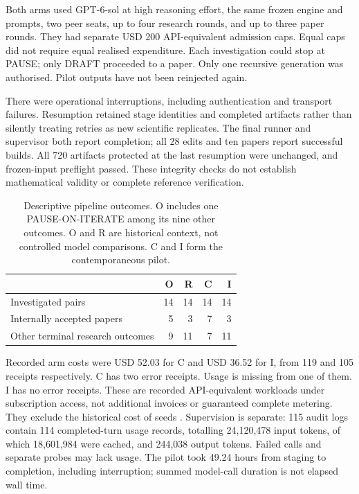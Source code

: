 \documentclass[11pt,a4paper]{article}
\begin{document}
Both arms used GPT-6-sol at high reasoning effort, the same frozen engine
and prompts, two peer seats, up to four research rounds, and up to three
paper rounds. They had separate USD 200 API-equivalent admission caps.
Equal caps did not require equal realised expenditure. Each investigation
could stop at PAUSE; only DRAFT proceeded to a paper. Only one recursive
generation was authorised. Pilot outputs have not been reinjected again.

There were operational interruptions, including authentication and transport
failures. Resumption retained stage identities and completed artifacts rather
than silently treating retries as new scientific replicates. The final
runner and supervisor both report completion; all 28 edits and ten papers
report successful builds. All 720 artifacts protected at the last resumption
were unchanged, and frozen-input preflight passed. These integrity checks do
not establish mathematical validity or complete reference verification.

\begin{table}[ht]
\centering\small
\begin{tabular}{lrrrr}
\toprule
 & O & R & C & I\\
\midrule
Investigated pairs &14&14&14&14\\
Internally accepted papers &5&3&7&3\\
Other terminal research outcomes &9&11&7&11\\
\bottomrule
\end{tabular}
\caption{Descriptive pipeline outcomes. O includes one PAUSE-ON-ITERATE
among its nine other outcomes. O and R are historical context, not controlled
model comparisons. C and I form the contemporaneous pilot.}
\end{table}

Recorded arm costs were USD 52.03 for C and USD 36.52 for I, from 119 and
105 receipts respectively. C has two error receipts. Usage is missing from
one of them. I has no error receipts. These are recorded API-equivalent workloads under subscription
access, not additional invoices or guaranteed complete metering. They exclude
the historical cost of seeds \cite{readout}. Supervision is separate: 115 audit logs contain
114 completed-turn usage records, totalling 24,120,478 input tokens, of which
18,601,984 were cached, and 244,038 output tokens. Failed calls and separate
probes may lack usage. The pilot took 49.24 hours from staging to completion,
including interruption; summed model-call duration is not elapsed wall time.
\end{document}
